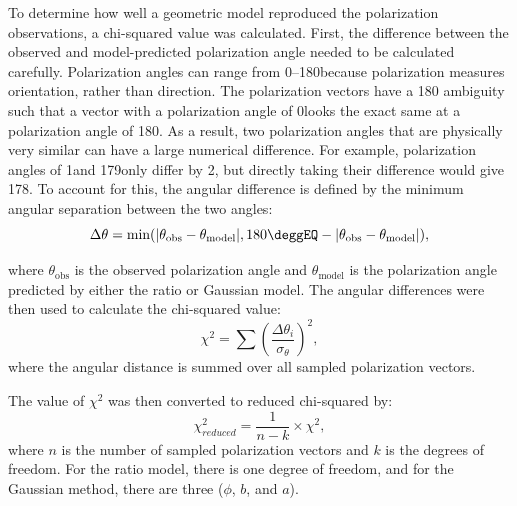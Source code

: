 



To determine how well a geometric model reproduced the polarization observations, a chi-squared value was calculated. First, the difference between the observed and model-predicted polarization angle needed to be calculated carefully. Polarization angles can range from 0--180\degg because polarization measures orientation, rather than direction. The polarization vectors have a 180 \degg ambiguity such that a vector with a polarization angle of 0\degg looks the exact same at a polarization angle of 180\deggNS. As a result, two polarization angles that are physically very similar can have a large numerical difference. For example, polarization angles of 1\degg and 179\degg only differ by 2\deggNS, but directly taking their difference would give 178\deggNS. To account for this, the angular difference is defined by the minimum angular separation between the two angles:
\begin{equation}
    \Delta \theta = \text{min}(|\theta_{\text{obs}} - \theta_{\text{model}}|, 180\deggEQ - |\theta_{\text{obs}} - \theta_{\text{model}}|),
    \label{eq: minimum_separation}
\end{equation}

\noindent where $\theta_{\text{obs}}$ is the observed polarization angle and $\theta_{\text{model}}$ is the polarization angle predicted by either the ratio or Gaussian model. The angular differences were then used to calculate the chi-squared value:
\begin{equation}
    \chi^2 = \sum \left(\frac{\Delta \theta_i}{\sigma_\theta}\right)^2,
    \label{eq: chi_sq}
\end{equation}
\noindent where the angular distance is summed over all sampled polarization vectors. 

The value of $\chi^2$ was then converted to reduced chi-squared by:
\begin{equation}
    \chi^2_{reduced} = \frac{1}{n-k} \times \chi^2,
    \label{eq: chi_sq_reduced}
\end{equation}
\noindent where $n$ is the number of sampled polarization vectors and $k$ is the degrees of freedom. For the ratio model, there is one degree of freedom, and for the Gaussian method, there are three ($\phi$, $b$, and $a$). 